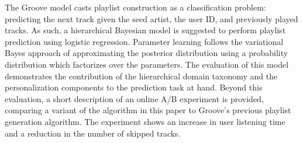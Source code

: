 The Groove model casts playlist construction as a classification problem: predicting the next track given the seed artist, the user ID, and previously played tracks. 
As such, a hierarchical Bayesian model is suggested to perform playlist prediction using logistic regression. 
Parameter learning follows the variational Bayes approach of approximating the posterior distribution using a probability distribution which factorizes over the parameters. 
The evaluation of this model demonstrates the contribution of the hierarchical domain taxonomy and the personalization components to the prediction task at hand. 
Beyond this evaluation, a short description of an online A/B experiment is provided, comparing a variant of the algorithm in this paper to Groove's previous playlist generation algorithm. The experiment shows an increase in user listening time and a reduction in the number of skipped tracks.




